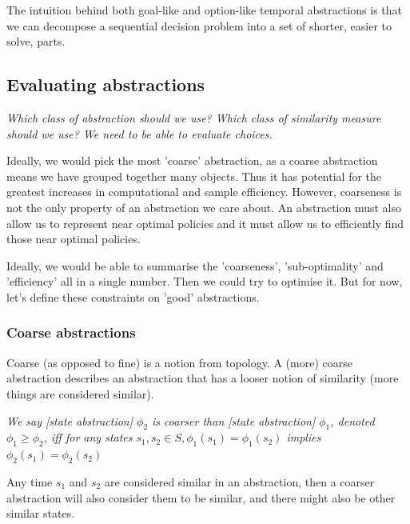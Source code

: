 The intuition behind both goal-like and option-like temporal abstractions is that
we can decompose a sequential decision problem into a set of shorter, easier to solve, parts.


\subsection{Evaluating abstractions}\label{eval-abstractions}

\begin{displayquote}
\textsl{
Which class of abstraction should we use?
Which class of similarity measure should we use?
We need to be able to evaluate choices.}
\end{displayquote}

Ideally, we would pick the most 'coarse' abstraction, as a coarse abstraction means we have grouped together many objects.
Thus it has potential for the greatest increases in computational and sample efficiency.
However, coarseness is not the only property of an abstraction we care about.
An abstraction must also allow us to represent near optimal policies and it must allow us
to efficiently find those near optimal policies.

Ideally, we would be able to summarise the 'coarseness', 'sub-optimality' and 'efficiency' all in a single number.
Then we could try to optimise it. But for now, let's define these constraints on 'good' abstractions.

\subsubsection{Coarse abstractions}


Coarse (as opposed to fine) is a notion from topology.
A (more) coarse abstraction describes an abstraction that has a looser
notion of similarity (more things are considered similar). \footnotemark[24]


\textit{We say [state abstraction] $\phi_2$ is coarser than [state abstraction] $\phi_1$, denoted $\phi_1 \ge \phi_2$,
iff for any states $s_1, s_2 \in S, \phi_1(s_1) = \phi_1(s_2)$ implies $\phi_2(s_1) = \phi_2(s_2)$ \cite{Littman2006}}

Any time $s_1$ and $s_2$ are considered similar in an abstraction, then a coarser
abstraction will also consider them to be similar, and there might also be other similar states. \footnotemark[25]

